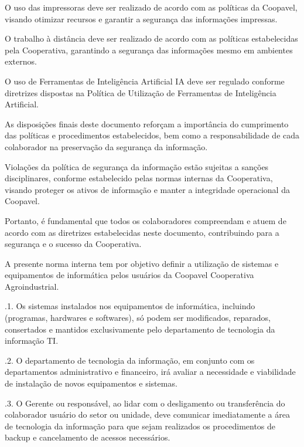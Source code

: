 \documentclass[letterpaper,10pt,portuges]{sphinxmanual}
\begin{document}
\sphinxAtStartPar
O uso das impressoras deve ser realizado de acordo com as políticas da Coopavel,
visando otimizar recursos e garantir a segurança das informações impressas.

\sphinxAtStartPar
O trabalho à distância deve ser realizado de acordo com as políticas estabelecidas pela
Cooperativa, garantindo a segurança das informações mesmo em ambientes externos.

\sphinxAtStartPar
O uso de Ferramentas de Inteligência Artificial \sphinxhyphen{} IA deve ser regulado conforme diretrizes
dispostas na Política de Utilização de Ferramentas de Inteligência Artificial.

\sphinxAtStartPar
As disposições finais deste documento reforçam a importância do cumprimento das
políticas e procedimentos estabelecidos, bem como a responsabilidade de cada
colaborador na preservação da segurança da informação.

\sphinxAtStartPar
Violações da política de segurança da informação estão sujeitas a sanções disciplinares,
conforme estabelecido pelas normas internas da Cooperativa, visando proteger os ativos
de informação e manter a integridade operacional da Coopavel.

\sphinxAtStartPar
Portanto, é fundamental que todos os colaboradores compreendam e atuem de acordo com
as diretrizes estabelecidas neste documento, contribuindo para a segurança e o sucesso da
Cooperativa.

\sphinxAtStartPar
A presente norma interna tem por objetivo definir a utilização de sistemas e equipamentos
de informática pelos usuários da Coopavel Cooperativa Agroindustrial.

.1. Os sistemas instalados nos equipamentos de informática, incluindo (programas,
hardwares e softwares), só podem ser modificados, reparados, consertados e mantidos
exclusivamente pelo departamento de tecnologia da informação \sphinxhyphen{} TI.

.2. O departamento de tecnologia da informação, em conjunto com os departamentos
administrativo e financeiro, irá avaliar a necessidade e viabilidade de instalação de novos
equipamentos e sistemas.

.3. O Gerente ou responsável, ao lidar com o desligamento ou transferência do
colaborador usuário do setor ou unidade, deve comunicar imediatamente a área de
tecnologia da informação para que sejam realizados os procedimentos de backup e
cancelamento de acessos necessários.
\end{document}
